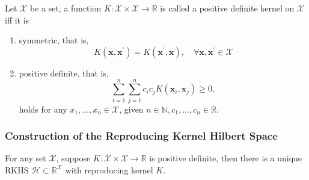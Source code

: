 \begin{definition}
    Let $\mathcal{X}$ be a set, a function $K:\mathcal{X}\times\mathcal{X}\rightarrow\mathbb{R}$ is called a positive definite kernel on $\mathcal{X}$ iff it is
    \begin{enumerate}
        \item symmetric, that is,
              \begin{equation}
                  K\left(\mathbf{x},\mathbf{x}^{\prime}\right)=K\left(\mathbf{x}^{\prime},\mathbf{x}\right),\quad\forall\mathbf{x},\mathbf{x}^{\prime}\in\mathcal{X}
              \end{equation}
        \item positive definite, that is,
              \begin{equation}
                  \sum_{i=1}^{n}\sum_{j=1}^{n}c_{i}c_{j}K\left(\mathbf{x}_{i},\mathbf{x}_{j}\right)\geq 0,
              \end{equation}
              holds for any $x_{1},\ldots,x_{n}\in\mathcal{X}$, given $n\in\mathbb{N},c_{1},\ldots,c_{n}\in\mathbb{R}$.
    \end{enumerate}
\end{definition}

\subsubsection{Construction of the Reproducing Kernel Hilbert Space}

\begin{theorem} \label{thm:morse-aronszajn}
    For any set $\mathcal{X}$, suppose $K:\mathcal{X}\times\mathcal{X}\rightarrow\mathbb{R}$ is positive definite, then there is a unique RKHS $\mathcal{H}\subset\mathbb{R}^{\mathcal{X}}$ with reproducing kernel $K$.
\end{theorem}

